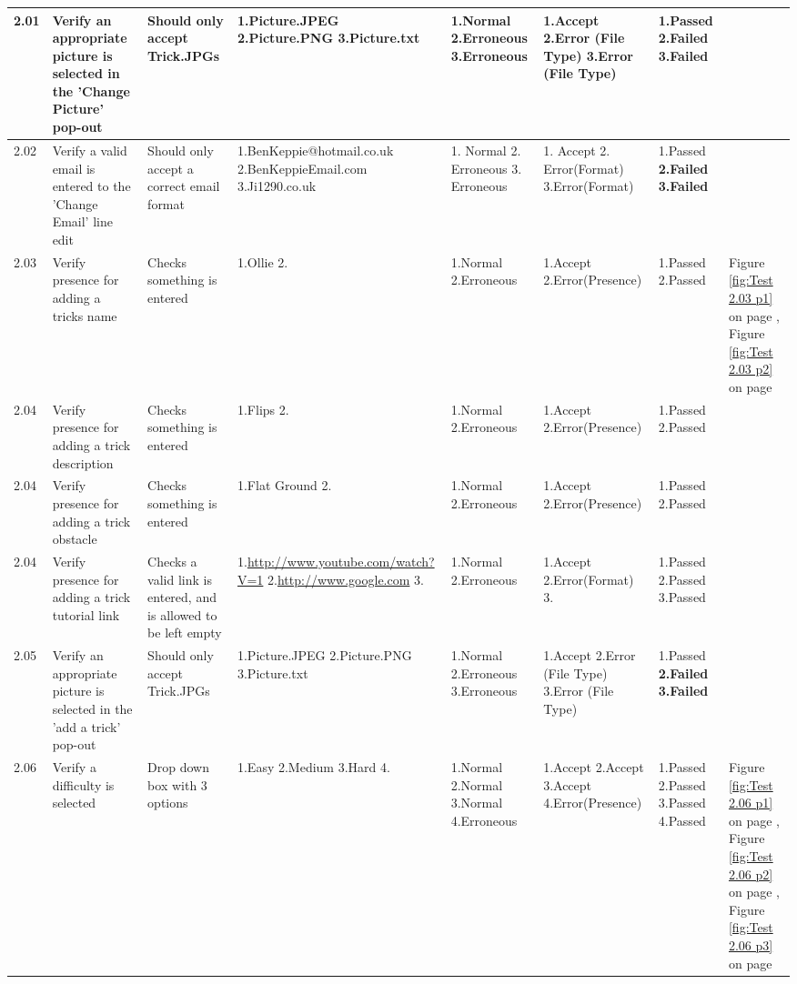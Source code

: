 \begin{landscape}
\begin{center}
\begin{longtable}{|p{1.5cm}|p{2.5cm}|p{2.5cm}|p{2cm}|p{2cm}|p{2cm}|p{2cm}|p{2cm}|}
2.01 & Verify an appropriate picture is selected in the 'Change Picture' pop-out & Should only accept Trick.JPGs & 1.Picture.JPEG 2.Picture.PNG 3.Picture.txt & 1.Normal 2.Erroneous 3.Erroneous & 1.Accept 2.Error (File Type) 3.Error (File Type) & 1.Passed \textbf{2.Failed 3.Failed} & \\ \hline

2.02 & Verify a valid email is entered to the 'Change Email' line edit & Should only accept a correct email format & 1.BenKeppie@hotmail.co.uk 2.BenKeppieEmail.com  3.Ji1290.co.uk & 1. Normal 2. Erroneous 3. Erroneous & 1. Accept 2. Error(Format) 3.Error(Format) & 1.Passed \textbf{2.Failed 3.Failed} & \\ \hline

2.03 & Verify presence for adding a tricks name & Checks something is entered & 1.Ollie 2.  & 1.Normal 2.Erroneous & 1.Accept 2.Error(Presence) & 1.Passed 2.Passed & Figure \ref{fig:Test 2.03 p1} on page \pageref{fig:Test 2.03 p1}, Figure \ref{fig:Test 2.03 p2} on page \pageref{fig:Test 2.03 p2}\\ \hline

2.04 & Verify presence for adding a trick description & Checks something is entered & 1.Flips 2. & 1.Normal 2.Erroneous & 1.Accept 2.Error(Presence) & 1.Passed 2.Passed & \\ \hline

2.04 & Verify presence for adding a trick obstacle & Checks something is entered & 1.Flat Ground 2. & 1.Normal 2.Erroneous & 1.Accept 2.Error(Presence) & 1.Passed 2.Passed & \\ \hline

2.04 & Verify presence for adding a trick tutorial link & Checks a valid link is entered, and is allowed to be left empty & 1.\url{http://www.youtube.com/watch?V=1} 2.\url{http://www.google.com} 3. & 1.Normal 2.Erroneous & 1.Accept 2.Error(Format) 3. & 1.Passed 2.Passed 3.Passed & \\ \hline

2.05 & Verify an appropriate picture is selected in the 'add a trick' pop-out & Should only accept Trick.JPGs & 1.Picture.JPEG 2.Picture.PNG 3.Picture.txt & 1.Normal 2.Erroneous 3.Erroneous & 1.Accept 2.Error (File Type) 3.Error (File Type) & 1.Passed \textbf{2.Failed 3.Failed} & \\ \hline

2.06 & Verify a difficulty is selected & Drop down box with 3 options & 1.Easy 2.Medium 3.Hard 4. & 1.Normal 2.Normal 3.Normal 4.Erroneous & 1.Accept 2.Accept 3.Accept 4.Error(Presence) & 1.Passed 2.Passed 3.Passed 4.Passed & Figure \ref{fig:Test 2.06 p1} on page \pageref{fig:Test 2.06 p1}, Figure \ref{fig:Test 2.06 p2} on page \pageref{fig:Test 2.06 p2}, Figure \ref{fig:Test 2.06 p3} on page \pageref{fig:Test 2.06 p3} \\ \hline



\end{longtable}
\end{center}
\end{landscape}
